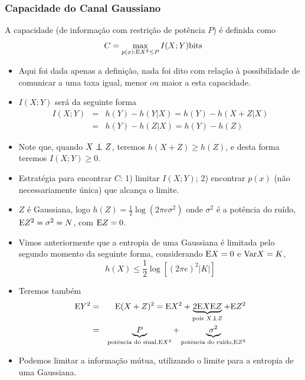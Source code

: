 \begin{frame}[allowframebreaks]
  \frametitle{Capacidade do Canal Gaussiano}

  \begin{definition}
  A capacidade (de informação com restrição de potência $P$) é definida como
	\begin{equation}
	C = \max_{p(x): \mathrm{E} X^2 \leq P} I(X;Y) \text{bits}
	\end{equation}
  \end{definition}

  \begin{itemize}
  \item Aqui foi dada apenas a definição, nada foi dito com relação à possibilidade de comunicar 
	a uma taxa igual, menor ou maior a esta capacidade.
  \item $I(X;Y)$ será da seguinte forma
	\begin{eqnarray}
	I(X;Y) &=& h(Y) - h(Y|X) = h(Y) - h(X + Z | X) \\
		&=& h(Y) - h(Z|X) = h(Y) - h(Z)
	\end{eqnarray}
  \item Note que, quando $X \independent Z$, teremos $h(X+Z) \geq h(Z)$, e desta forma teremos $I(X;Y) \geq 0$.
  \item Estratégia para encontrar $C$: 1) limitar $I(X;Y)$; 2) encontrar $p(x)$ (não necessariamente única)
	que alcança o limite.
  \item $Z$ é Gaussiana, logo $h(Z) = \frac{1}{2} \log (2 \pi e \sigma^2)$ onde $\sigma^2$ é a potência do ruído,
	$\mathrm{E} Z^2 = \sigma^2 = N$, com $\mathrm{E} Z = 0$.
  \item Vimos anteriormente que a entropia de uma Gaussiana é limitada pelo segundo momento da seguinte forma,
	considerando $\mathrm{E} X = 0$ e $\mathrm{Var} X = K$,
	\begin{equation}
	h(X) \leq \frac{1}{2} \log [(2 \pi e)^2 | K |]
	\end{equation}
  \item Teremos também
	\begin{eqnarray}
	\E Y^2 &=& \E (X+Z)^2 = \E X^2 + \underbrace{2 \E X \E Z}_{\text{pois } X \independent Z} + \E Z^2 \\
		&=& \underbrace{P}_{\text{potência do sinal,} \E X^2} + \underbrace{\sigma^2}_{\text{potência do ruído,} \E Z^2}
	\end{eqnarray}
  \item Podemos limitar a informação mútua, utilizando o limite para a entropia de uma Gaussiana.
	\begin{eqnarray}

\end{eqnarray}
\end{itemize}
\end{frame}
